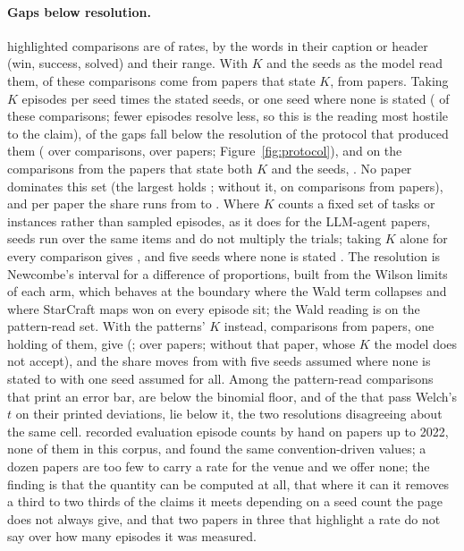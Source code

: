 \documentclass[sigconf,anonymous]{aamas}
\begin{document}
\paragraph{Gaps below resolution.} \nResRateLike{} highlighted comparisons
are of rates, by the words in their caption or header (win, success, solved)
and their range. With $K$ and the seeds as the model read them,
\nPrdResN{} of these comparisons come from papers that state $K$, from
\nPrdResPapers{} papers. Taking $K$ episodes per seed times the stated
seeds, or one seed where none is stated (\nPrdResSeedAssumedOne{} of these
comparisons; fewer episodes resolve less, so this is the reading most
hostile to the claim), \nPrdResBelow{} of the gaps fall below the
resolution of the protocol that produced them (\nPrdResBelowCi{} over
comparisons, \nPrdResBelowPaperCi{} over papers;
Figure~\ref{fig:protocol}), and on the
\nPrdResStatedN{} comparisons from the \nPrdResStatedPapers{} papers that
state both $K$ and the seeds, \nPrdResStatedBelow{}. No paper dominates
this set (the largest holds \nPrdLargestPaperShare{}; without it,
\nPrdWithoutLargestBelow{} on \nPrdWithoutLargestN{} comparisons from
\nPrdWithoutLargestPapers{} papers), and per paper the share runs from
\nPrdPerPaperLo{} to \nPrdPerPaperHi{}. Where $K$ counts a fixed set of
tasks or instances rather than sampled episodes, as it does for the
LLM-agent papers, seeds run over the same items and do not multiply the
trials; taking $K$ alone for every comparison gives
\nPrdSpanSeedsOneForAllBelow{}, and five seeds where none is stated
\nPrdSpanSeedsStatedOrFiveBelow{}. The resolution is
Newcombe's interval for a difference of proportions, built from the Wilson
limits of each arm, which behaves at the boundary where the Wald term
collapses and where StarCraft maps won on every episode sit; the Wald
reading is \nResBelowWaldPct{} on the pattern-read set. With the patterns'
$K$ instead, \nResWithK{} comparisons from
\nResPapers{} papers, one holding \nPspanLargestPaperShare{} of them, give
\nResBelowPct{} (\nResBelowCi{}; \nResBelowPaperCi{} over papers;
\nPspanWithoutLargestBelow{} without that paper, whose $K$ the model does
not accept), and the share moves from \nPspanSeedsStatedOrFiveBelow{}
with five seeds assumed where none is stated to
\nPspanSeedsOneForAllBelow{} with one seed assumed for all. Among the \nResBarredN{} pattern-read comparisons that print an
error bar, \nResBarredBelow{} are below the binomial floor, and of the
\nResBarredWelchPass{} that pass Welch's $t$ on their printed deviations,
\nResBarredWelchPassBelow{} lie below it, the two resolutions disagreeing
about the same cell. \citet{gorsane2022towards} recorded evaluation episode counts by hand on
papers up to 2022, none of them in this corpus, and found the same
convention-driven values; a dozen papers are too few to carry a rate for
the venue and we offer none; the finding is that the quantity can be computed
at all, that where it can it removes a third to two thirds of the claims it
meets depending on a seed count the page does not always give, and that
two papers in three that highlight a rate do not say over how many episodes
it was measured.
\end{document}
